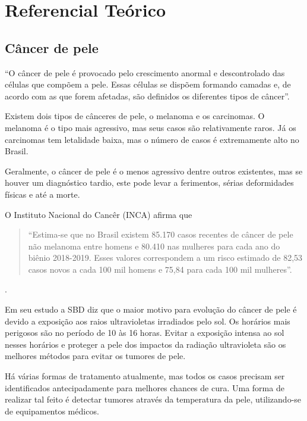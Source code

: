 
\chapter[Referencial Teórico]{Referencial Teórico}

\section{Câncer de pele}

    ``O câncer de pele é provocado pelo crescimento anormal e descontrolado das células que compõem a pele. Essas células se dispõem formando camadas e, de acordo com as que forem afetadas, são definidos os diferentes tipos de câncer''\cite{sbd}.
    
    Existem dois tipos de cânceres de pele, o melanoma e os carcinomas. O melanoma é o tipo mais agressivo, mas seus casos são relativamente raros. Já os carcinomas tem letalidade baixa, mas  o número de casos é extremamente alto no Brasil.
    
    Geralmente, o câncer de pele é o menos agressivo dentre  outros  existentes, mas se houver um diagnóstico tardio, este pode levar a ferimentos, sérias deformidades físicas e até a morte.
    
               
    O Instituto Nacional do Cancêr (INCA) afirma que  \begin{quotation}
    
    
    
   ``Estima-se que no Brasil existem 85.170 casos recentes de câncer de pele não melanoma entre homens e 80.410 nas mulheres para cada ano do biênio 2018-2019. Esses valores correspondem a um risco estimado de 82,53 casos novos a cada 100 mil homens e 75,84 para cada 100 mil mulheres''\cite[p.54]{Estimativa}.
  \end{quotation}
    .%
              
    Em seu estudo a SBD diz que  o maior motivo para evolução do câncer de pele é devido a exposição aos raios ultravioletas irradiados pelo sol. Os horários mais perigosos são no período de 10 às 16 horas. Evitar a exposição intensa ao sol nesses horários e proteger a pele dos impactos da radiação ultravioleta são os melhores métodos para evitar os tumores de pele.%

 


 Há várias formas de tratamento atualmente, mas todos os casos precisam ser identificados antecipadamente para melhores chances de cura. Uma forma de realizar tal feito  é detectar tumores através da temperatura da pele, utilizando-se de equipamentos médicos.
 
